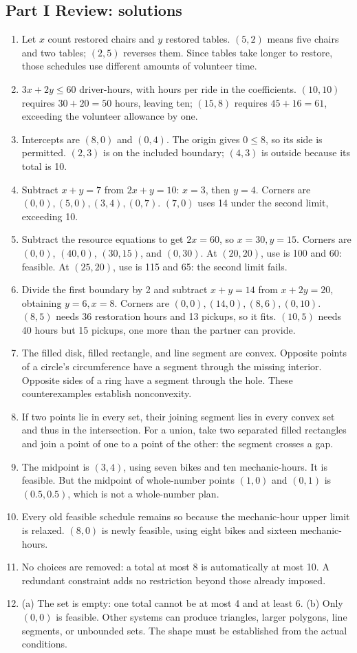\documentclass[11pt,letterpaper]{article}
\begin{document}
{\subsection*{Part I Review: solutions}
\begin{enumerate}
\item Let $x$ count restored chairs and $y$ restored tables. $(5,2)$ means five chairs and two tables; $(2,5)$ reverses them. Since tables take longer to restore, those schedules use different amounts of volunteer time.
\item $3x+2y\leq60$ driver-hours, with hours per ride in the coefficients. $(10,10)$ requires $30+20=50$ hours, leaving ten; $(15,8)$ requires $45+16=61$, exceeding the volunteer allowance by one.
\item Intercepts are $(8,0)$ and $(0,4)$. The origin gives $0\leq8$, so its side is permitted. $(2,3)$ is on the included boundary; $(4,3)$ is outside because its total is 10.
\item Subtract $x+y=7$ from $2x+y=10$: $x=3$, then $y=4$. Corners are $(0,0),(5,0),(3,4),(0,7)$. $(7,0)$ uses 14 under the second limit, exceeding 10.
\item Subtract the resource equations to get $2x=60$, so $x=30,y=15$. Corners are $(0,0)$, $(40,0)$, $(30,15)$, and $(0,30)$. At $(20,20)$, use is 100 and 60: feasible. At $(25,20)$, use is 115 and 65: the second limit fails.
\item Divide the first boundary by 2 and subtract $x+y=14$ from $x+2y=20$, obtaining $y=6,x=8$. Corners are $(0,0),(14,0),(8,6),(0,10)$. $(8,5)$ needs 36 restoration hours and 13 pickups, so it fits. $(10,5)$ needs 40 hours but 15 pickups, one more than the partner can provide.
\newpage
\item The filled disk, filled rectangle, and line segment are convex. Opposite points of a circle's circumference have a segment through the missing interior. Opposite sides of a ring have a segment through the hole. These counterexamples establish nonconvexity.
\item If two points lie in every set, their joining segment lies in every convex set and thus in the intersection. For a union, take two separated filled rectangles and join a point of one to a point of the other: the segment crosses a gap.
\item The midpoint is $(3,4)$, using seven bikes and ten mechanic-hours. It is feasible. But the midpoint of whole-number points $(1,0)$ and $(0,1)$ is $(0.5,0.5)$, which is not a whole-number plan.
\item Every old feasible schedule remains so because the mechanic-hour upper limit is relaxed. $(8,0)$ is newly feasible, using eight bikes and sixteen mechanic-hours.
\item No choices are removed: a total at most 8 is automatically at most 10. A redundant constraint adds no restriction beyond those already imposed.
\item (a) The set is empty: one total cannot be at most 4 and at least 6. (b) Only $(0,0)$ is feasible. Other systems can produce triangles, larger polygons, line segments, or unbounded sets. The shape must be established from the actual conditions.
\end{enumerate}
}
\end{document}
